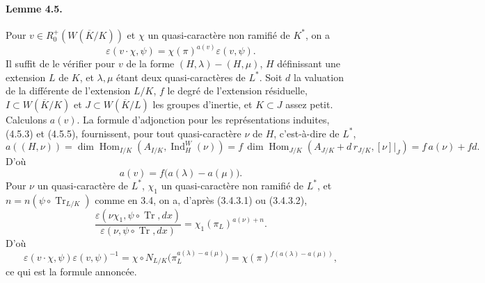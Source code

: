 \documentclass[10pt]{article}
\newcommand{\Hom}{\operatorname{Hom}}
\newcommand{\Ind}{\operatorname{Ind}}
\newcommand{\Tr}{\operatorname{Tr}}
\providecommand{\Hom}{\operatorname{Hom}}
\providecommand{\Hom}{\operatorname{Hom}}
\providecommand{\Tr}{\operatorname{Tr}}
\providecommand{\Hom}{\operatorname{Hom}}
\providecommand{\Tr}{\operatorname{Tr}}
\providecommand{\Tr}{\operatorname{Tr}}
\providecommand{\Ind}{\operatorname{Ind}}
\begin{document}
\paragraph{Lemme 4.5.} Pour \(v\in R^+_0(W(\overline K/K))\) et \(\chi\) un quasi-caractère non ramifié de \(K^*\), on a
\[
\varepsilon(v\cdot\chi,\psi)=\chi(\pi)^{a(v)}\varepsilon(v,\psi).
\]
Il suffit de le vérifier pour \(v\) de la forme \((H,\lambda)-(H,\mu)\), \(H\) définissant une extension \(L\) de \(K\), et \(\lambda,\mu\) étant deux quasi-caractères de \(L^*\). Soit \(d\) la valuation de la différente de l'extension \(L/K\), \(f\) le degré de l'extension résiduelle, \(I\subset W(\overline K/K)\) et \(J\subset W(\overline K/L)\) les groupes d'inertie, et \(K\subset J\) assez petit. Calculons \(a(v)\). La formule d'adjonction pour les représentations induites, (4.5.3) et (4.5.5), fournissent, pour tout quasi-caractère \(\nu\) de \(H\), c'est-à-dire de \(L^*\),
\[
\tag{4.5.1'}
a((H,\nu))
=\dim\Hom_{I/K}(A_{I/K},\Ind_H^W(\nu))
=f\,\dim\Hom_{J/K}(A_{J/K}+d\,r_{J/K},[\nu]|_J)
=f\,a(\nu)+fd.
\]
D'où
\[
a(v)=f\bigl(a(\lambda)-a(\mu)\bigr).
\]
Pour \(\nu\) un quasi-caractère de \(L^*\), \(\chi_1\) un quasi-caractère non ramifié de \(L^*\), et \(n=n(\psi\circ\Tr_{L/K})\) comme en 3.4, on a, d'après (3.4.3.1) ou (3.4.3.2),
\[
\frac{\varepsilon(\nu\chi_1,\psi\circ\Tr,dx)}
     {\varepsilon(\nu,\psi\circ\Tr,dx)}
=
\chi_1(\pi_L)^{a(\nu)+n}.
\]
D'où
\[
\varepsilon(v\cdot\chi,\psi)\varepsilon(v,\psi)^{-1}
=
\chi\circ N_{L/K}\bigl(\pi_L^{a(\lambda)-a(\mu)}\bigr)
=
\chi(\pi)^{f(a(\lambda)-a(\mu))},
\]
ce qui est la formule annoncée.


\newpage
\end{document}
